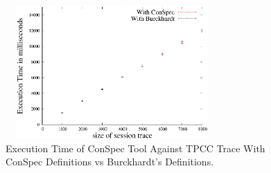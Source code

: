 \documentclass[journal, compsoc]{IEEEtran}
\begin{document}
	\begin{figure}%
		\includegraphics[width=3.2in,height=2in]
		{conspecTPCCvarhist.eps} %
		\caption{Execution Time of ConSpec Tool Against TPCC Trace With ConSpec Definitions vs Burckhardt's Definitions.}
		\label{fig:examplefulltpcc}
	\end{figure}
\end{document}
